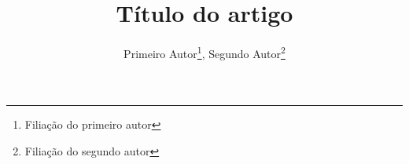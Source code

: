 

\title{Título do artigo}
\author{Primeiro Autor\thanks{Filiação do primeiro autor}, Segundo Autor\thanks{Filiação do segundo autor}}



\date{}



\maketitle


